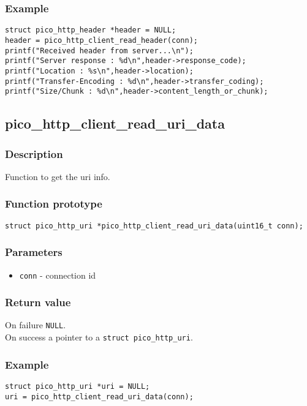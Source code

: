 \subsubsection*{Example}
\begin{verbatim}
struct pico_http_header *header = NULL;
header = pico_http_client_read_header(conn);
printf("Received header from server...\n");
printf("Server response : %d\n",header->response_code);
printf("Location : %s\n",header->location);
printf("Transfer-Encoding : %d\n",header->transfer_coding);
printf("Size/Chunk : %d\n",header->content_length_or_chunk);
\end{verbatim}


\subsection{pico\_http\_client\_read\_uri\_data}

\subsubsection*{Description}
Function to get the uri info.

\subsubsection*{Function prototype}
\texttt{struct pico\_http\_uri *pico\_http\_client\_read\_uri\_data(uint16\_t conn);}

\subsubsection*{Parameters}
\begin{itemize}[noitemsep]
\item \texttt{conn} - connection id
\end{itemize}

\subsubsection*{Return value}
On failure \texttt{NULL}.
\\On success a pointer to a \texttt{struct pico\_http\_uri}.

\subsubsection*{Example}
\begin{verbatim}
struct pico_http_uri *uri = NULL;
uri = pico_http_client_read_uri_data(conn);
\end{verbatim}

